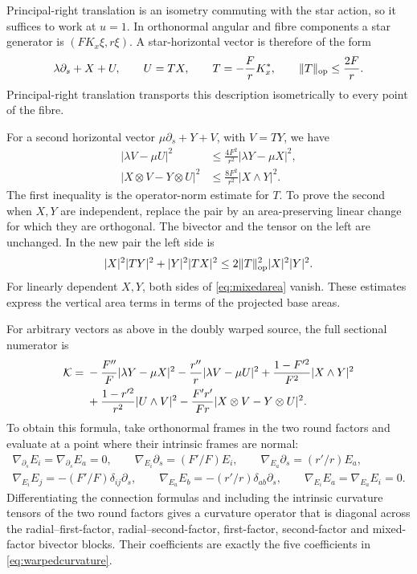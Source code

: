 \documentclass[12pt]{amsart}
\numberwithin{equation}{section}
\theoremstyle{remark}
\newcommand{\cK}{\mathcal K}
\begin{document}
Principal-right translation is an isometry commuting with the star
action, so it suffices to work at \(u=1\). In orthonormal
angular and fibre components a star generator is \((FK_x\xi,r\xi)\).
A star-horizontal vector is therefore of the form
\begin{equation}\label{eq:horizontalgraph}
\lambda\partial_s+X+U,\qquad
U=TX,\qquad T=-\frac F rK_x^*,\qquad \|T\|_{\rm op}\le\frac{2F}{r}.
\end{equation}
Principal-right translation transports this description isometrically
to every point of the fibre.

For a second horizontal vector \(\mu\partial_s+Y+V\), with \(V=TY\),
we have
\begin{align}
|\lambda V-\mu U|^2
  &\le\frac{4F^2}{r^2}|\lambda Y-\mu X|^2,
\label{eq:radialarea}\\
|X\otimes V-Y\otimes U|^2
  &\le\frac{8F^2}{r^2}|X\wedge Y|^2.
\label{eq:mixedarea}
\end{align}
The first inequality is the operator-norm estimate for \(T\).
To prove the second when \(X,Y\) are independent, replace the pair
by an area-preserving linear change for which they are orthogonal.
The bivector and the tensor on the left are unchanged. In the new
pair the left side is
\[
|X|^2|TY|^2+|Y|^2|TX|^2
          \le2\|T\|_{\rm op}^2|X|^2|Y|^2.
\]
For linearly dependent \(X,Y\), both sides of
\eqref{eq:mixedarea} vanish. These estimates express the vertical
area terms in terms of the projected base areas.

For arbitrary vectors as above in the doubly warped source,
the full sectional numerator is
\begin{align}
\cK={}&-\frac{F''}{F}|\lambda Y-\mu X|^2
       -\frac{r''}{r}|\lambda V-\mu U|^2
       +\frac{1-F'^2}{F^2}|X\wedge Y|^2\notag\\
 &+\frac{1-r'^2}{r^2}|U\wedge V|^2
       -\frac{F'r'}{Fr}|X\otimes V-Y\otimes U|^2.
\label{eq:warpedcurvature}
\end{align}
To obtain this formula, take orthonormal frames in the two round
factors and evaluate at a point where their intrinsic frames are
normal:
\[
\begin{gathered}
\nabla_{\partial_s}E_i=\nabla_{\partial_s}E_a=0,\qquad
\nabla_{E_i}\partial_s=(F'/F)E_i,\qquad
\nabla_{E_a}\partial_s=(r'/r)E_a,\\
\nabla_{E_i}E_j=-(F'/F)\delta_{ij}\partial_s,\qquad
\nabla_{E_a}E_b=-(r'/r)\delta_{ab}\partial_s,\qquad
\nabla_{E_i}E_a=\nabla_{E_a}E_i=0.
\end{gathered}
\]
Differentiating the connection formulas and including the intrinsic
curvature tensors of the two round factors gives a curvature operator
that is
diagonal across the radial--first-factor, radial--second-factor,
first-factor, second-factor and mixed-factor bivector blocks.
Their coefficients are exactly the five coefficients in
\eqref{eq:warpedcurvature}.
\end{document}
